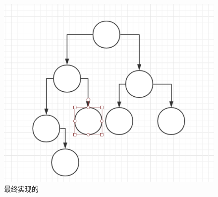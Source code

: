 \documentclass[UTF8]{ctexart}
\begin{document}
\begin{figure}[h]
	\centering
	\includegraphics[scale=0.6]{pic4.png}
\caption{最终实现的}
\end{figure}
%
%
\end{document}
